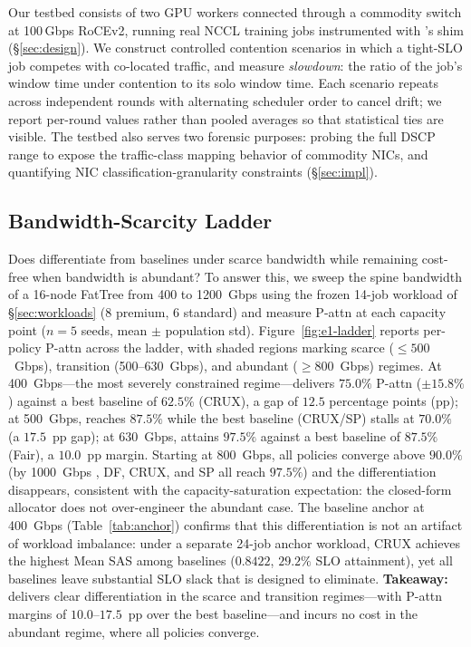 Our testbed consists of two GPU workers connected through a commodity switch at 100\,Gbps RoCEv2, running real NCCL training jobs instrumented with \Name's shim (\S\ref{sec:design}). We construct controlled contention scenarios in which a tight-SLO job competes with co-located traffic, and measure \emph{slowdown}: the ratio of the job's window time under contention to its solo window time. Each scenario repeats across independent rounds with alternating scheduler order to cancel drift; we report per-round values rather than pooled averages so that statistical ties are visible. The testbed also serves two forensic purposes: probing the full DSCP range to expose the traffic-class mapping behavior of commodity NICs, and quantifying NIC classification-granularity constraints (\S\ref{sec:impl}).

\subsection{Bandwidth-Scarcity Ladder}
\label{sec:eq1}

Does \Name differentiate from baselines under scarce bandwidth while remaining cost-free when bandwidth is abundant? To answer this, we sweep the spine bandwidth of a 16-node FatTree from 400 to 1200~Gbps using the frozen 14-job workload of \S\ref{sec:workloads} (8 premium, 6 standard) and measure P-attn at each capacity point ($n{=}5$ seeds, mean $\pm$ population std). Figure~\ref{fig:e1-ladder} reports per-policy P-attn across the ladder, with shaded regions marking scarce ($\leq500$~Gbps), transition (500--630~Gbps), and abundant ($\geq800$~Gbps) regimes. At 400~Gbps---the most severely constrained regime---\Name delivers $75.0\%$ P-attn ($\pm15.8\%$) against a best baseline of $62.5\%$ (CRUX), a gap of $12.5$ percentage points (pp); at 500~Gbps, \Name reaches $87.5\%$ while the best baseline (CRUX/SP) stalls at $70.0\%$ (a $17.5$~pp gap); at 630~Gbps, \Name attains $97.5\%$ against a best baseline of $87.5\%$ (Fair), a $10.0$~pp margin. Starting at 800~Gbps, all policies converge above $90.0\%$ (by 1000~Gbps \Name, DF, CRUX, and SP all reach $97.5\%$) and the differentiation disappears, consistent with the capacity-saturation expectation: the closed-form allocator does not over-engineer the abundant case. The baseline anchor at 400~Gbps (Table~\ref{tab:anchor}) confirms that this differentiation is not an artifact of workload imbalance: under a separate 24-job anchor workload, CRUX achieves the highest Mean SAS among baselines ($0.8422$, $29.2\%$ SLO attainment), yet all baselines leave substantial SLO slack that \Name is designed to eliminate. \textbf{Takeaway:} \Name delivers clear differentiation in the scarce and transition regimes---with P-attn margins of $10.0$--$17.5$~pp over the best baseline---and incurs no cost in the abundant regime, where all policies converge.

